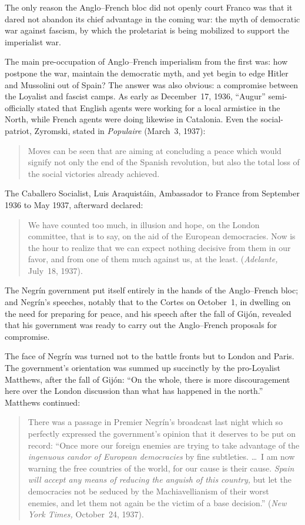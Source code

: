 The only reason the Anglo--French bloc did not openly court Franco was that it dared not abandon its chief advantage in the coming war: the myth of democratic war against fascism, by which the proletariat is being mobilized to support the imperialist war.

The main pre-occupation of Anglo--French imperialism from the first was: how postpone the war, maintain the democratic myth, and yet begin to edge Hitler and Mussolini out of Spain? The answer was also obvious: a compromise between the Loyalist and fascist camps. As early as December~17, 1936, ``Augur'' semi-officially stated that English agents were working for a local armistice in the North, while French agents were doing likewise in Catalonia. Even the social-patriot, Zyromski, stated in \emph{Populaire} (March~3, 1937):

\begin{quotation}
  Moves can be seen that are aiming at concluding a peace which would signify not only the end of the Spanish revolution, but also the total loss of the social victories already achieved.  
\end{quotation}

The Caballero Socialist, Luis Araquist\'ain, Ambassador to France from September 1936 to May 1937, afterward declared:

\begin{quotation}
  We have counted too much, in illusion and hope, on the London committee, that is to say, on the aid of the European democracies. Now is the hour to realize that we can expect nothing decisive from them in our favor, and from one of them much against us, at the least. (\emph{Adelante,} July~18, 1937).
\end{quotation}

The Negr\'in government put itself entirely in the hands of the Anglo--French bloc; and Negr\'in’s speeches, notably that to the Cortes on October~1, in dwelling on the need for preparing for peace, and his speech after the fall of Gij\'on, revealed that his government was ready to carry out the Anglo--French proposals for compromise.

The face of Negr\'in was turned not to the battle fronts but to London and Paris. The government’s orientation was summed up succinctly by the pro-Loyalist Matthews, after the fall of Gij\'on: ``On the whole, there is more discouragement here over the London discussion than what has happened in the north.'' Matthews continued:

\begin{quotation}
  There was a passage in Premier Negr\'in’s broadcast last ni\-ght which so perfectly expressed the government’s opinion that it deserves to be put on record: ``Once more our foreign enemies are trying to take advantage of the \emph{ingenuous candor of European democracies} by fine subtleties. \dots\ I am now warning the free countries of the world, for our cause is their cause. \emph{Spain will accept any means of reducing the anguish of this country,} but let the democracies not be seduced by the Machiavellianism of their worst enemies, and let them not again be the victim of a base decision.'' (\emph{New York Times,} October~24, 1937).
\end{quotation}

